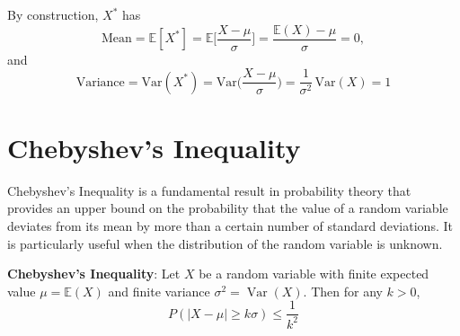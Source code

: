 \documentclass[twoside]{book}
\begin{document}
By construction, \(X^*\) has
\[
  \text{Mean} = \mathbb{E}[X^*]
  = \mathbb{E}\!\biggl[\frac{X - \mu}{\sigma}\biggr]
  = \frac{\mathbb{E}(X) - \mu}{\sigma}
  = 0,
\]
and
\[
  \text{Variance} = \mathrm{Var}(X^*)
  = \mathrm{Var}\!\biggl(\frac{X - \mu}{\sigma}\biggr)
  = \frac{1}{\sigma^2}\,\mathrm{Var}(X)
  = 1
\]

\section{Chebyshev's Inequality}
Chebyshev's Inequality is a fundamental result in probability theory that provides an upper bound on the probability that the value of a random variable deviates from its mean by more than a certain number of standard deviations. It is particularly useful when the distribution of the random variable is unknown.


\begin{textbox}
\textbf{Chebyshev's Inequality}: Let $X$ be a random variable with finite expected value $\mu = \mathbb{E}(X)$ and finite variance $\sigma^2 = \operatorname{Var}(X)$. Then for any $k > 0$,
\[
P(|X - \mu| \geq k\sigma) \leq \frac{1}{k^2}
\]
\end{textbox}
\end{document}
